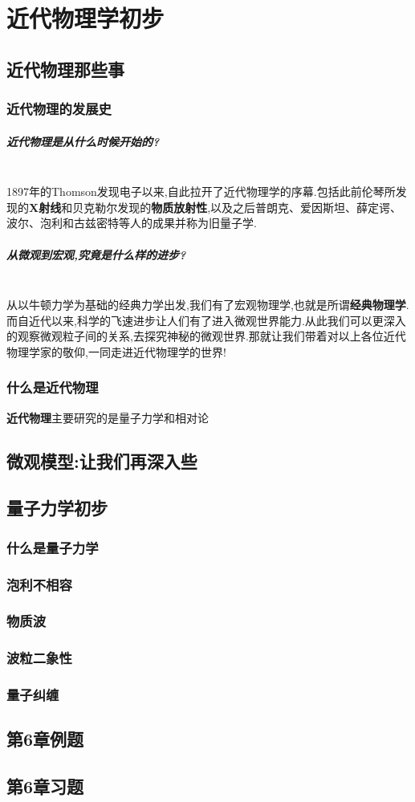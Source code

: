 \chapter{近代物理学初步}
\section{近代物理那些事}
\subsection{近代物理的发展史}
\paragraph{近代物理是从什么时候开始的?}\ 
\\1897年的Thomson发现电子以来,自此拉开了近代物理学的序幕.包括此前伦琴所发现的\textbf{X射线}和贝克勒尔发现的\textbf{物质放射性},以及之后普朗克、爱因斯坦、薛定谔、波尔、泡利和古兹密特等人的成果并称为旧量子学.
\paragraph{从微观到宏观,究竟是什么样的进步?}\ 
\\从以牛顿力学为基础的经典力学出发,我们有了宏观物理学,也就是所谓\textbf{经典物理学}.而自近代以来,科学的飞速进步让人们有了进入微观世界能力.从此我们可以更深入的观察微观粒子间的关系,去探究神秘的微观世界.那就让我们带着对以上各位近代物理学家的敬仰,一同走进近代物理学的世界! 
\subsection{什么是近代物理}
\textbf{近代物理}\cite{28}主要研究的是量子力学和相对论
\section{微观模型:让我们再深入些}
\section{量子力学初步}
\subsection{什么是量子力学}
\subsection{泡利不相容}
\subsection{物质波}
\subsection{波粒二象性}
\subsection{量子纠缠}
\section{第6章例题}
\section{第6章习题}